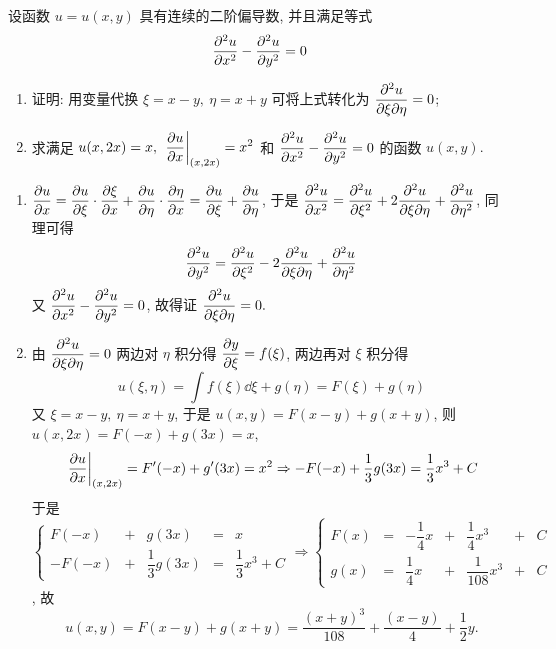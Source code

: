 \begin{example}
    设函数 $u=u(x,y)$ 具有连续的二阶偏导数, 并且满足等式 $$\pdv[2]{u}{x}-\pdv[2]{u}{y}=0$$
    \begin{enumerate}[label=(\arabic{*})]
        \item 证明: 用变量代换 $\xi=x-y,~\eta=x+y$ 可将上式转化为 $\displaystyle\pdv{u}{\xi}{\eta}=0$;
        \item 求满足 $\displaystyle u(x,2x)=x,~\eval{\pdv{u}{x}}_{(x,2x)}=x^2$ 和 $\displaystyle\pdv[2]{u}{x}-\pdv[2]{u}{y}=0$ 的函数 $u(x,y).$
    \end{enumerate}
\end{example}
\begin{solution}
    \begin{enumerate}[label=(\arabic{*})]
        \item $\displaystyle\pdv{u}{x}=\pdv{u}{\xi}\cdot\pdv{\xi}{x}+\pdv{u}{\eta}\cdot\pdv{\eta}{x}=\pdv{u}{\xi}+\pdv{u}{\eta}$, 于是 $\displaystyle\pdv[2]{u}{x}=\pdv[2]{u}{\xi}+2\pdv{u}{\xi}{\eta}+\pdv[2]{u}{\eta}$, 同理可得
              $$\pdv[2]{u}{y}=\pdv[2]{u}{\xi}-2\pdv{u}{\xi}{\eta}+\pdv[2]{u}{\eta}$$
              又 $\displaystyle \pdv[2]{u}{x}-\pdv[2]{u}{y}=0$, 故得证 $\displaystyle\pdv{u}{\xi}{\eta}=0.$
        \item 由 $\displaystyle\pdv{u}{\xi}{\eta}=0$ 两边对 $\eta$ 积分得 $\displaystyle\pdv{y}{\xi}=f(\xi)$, 两边再对 $\xi$ 积分得 $$u(\xi,\eta)=\int f(\xi) \dd \xi+g(\eta)=F(\xi)+g(\eta)$$
              又 $\xi=x-y,~\eta=x+y$, 于是 $u(x,y)=F(x-y)+g(x+y)$, 则 $u(x,2x)=F(-x)+g(3x)=x$, 
              $$\eval{\pdv{u}{x}}_{(x,2x)}=F'(-x)+g'(3x)=x^2\Rightarrow -F(-x)+\dfrac{1}{3}g(3x)=\dfrac{1}{3}x^3+C$$
              于是 $\left\{\begin{matrix}
                      F(-x)  & + & g(3x)             & = & x                 \\[6pt]
                      -F(-x) & + & \dfrac{1}{3}g(3x) & = & \dfrac{1}{3}x^3+C
                  \end{matrix}\right.\Rightarrow \left\{\begin{matrix}
                      F(x) & = & -\dfrac{1}{4}x & + & \dfrac{1}{4}x^3   & + & C \\[6pt]
                      g(x) & = & \dfrac{1}{4}x  & + & \dfrac{1}{108}x^3 & + & C
                  \end{matrix}\right.$, 故
              $$u(x,y)=F(x-y)+g(x+y)=\dfrac{(x+y)^3}{108}+\dfrac{(x-y)}{4}+\dfrac{1}{2}y.$$
    \end{enumerate}
\end{solution}